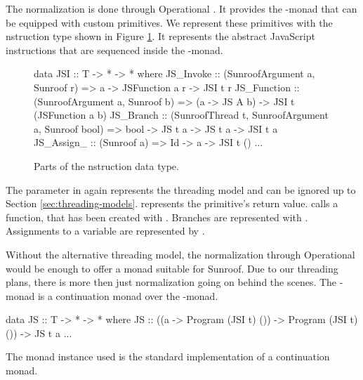 The normalization is done through Operational 
\cite{Apfelmus:10:Operational,Hackage:10:Operational}.
It provides the -monad that
can be equipped with custom primitives.
We represent these primitives with the \JSI nstruction 
type shown in Figure \ref{fig:jsi-definition}. It represents the 
abstract JavaScript instructions that are sequenced inside 
the -monad.
\begin{figure}
\begin{Code}
data JSI :: T -> * -> * where
  JS_Invoke   :: (SunroofArgument a, Sunroof r) 
              => a -> JSFunction a r -> JSI t r
  JS_Function :: (SunroofArgument a, Sunroof b) 
              => (a -> JS A b) -> JSI t (JSFunction a b)
  JS_Branch   :: (SunroofThread t, SunroofArgument a, Sunroof bool) 
              => bool -> JS t a -> JS t a  -> JSI t a
  JS_Assign_  :: (Sunroof a) => Id -> a -> JSI t ()
  ...
\end{Code}
\caption{Parts of the \JSI nstruction data type.}
\label{fig:jsi-definition}
\end{figure}
The parameter  in  again represents 
the threading model and can be ignored up to Section \ref{sec:threading-models}. 
 represents the primitive's return value. 
 calls a function, that has been created with .
Branches are represented with . Assignments to a variable
are represented by .

Without the alternative threading model, 
the normalization through Operational
would be enough to offer a monad suitable for Sunroof.
Due to our threading plans, there is more then just 
normalization going on behind the scenes. 
The \JS-monad is a continuation monad over the 
-monad.
\begin{Code}
data JS :: T -> * -> * where
  JS :: ((a -> Program (JSI t) ()) -> Program (JSI t) ()) -> JS t a
  ...
\end{Code}
The monad instance used is the standard implementation of 
a continuation monad.

